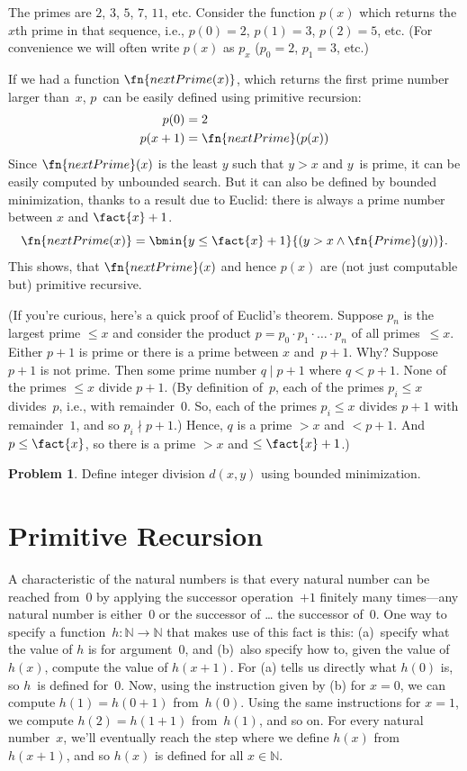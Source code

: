 \documentclass[10pt,a4paper]{article}
\theoremstyle{plain}
\theoremstyle{definition}
\newtheorem{prob}{Problem}[section]
\theoremstyle{remark}
\newcommand*{\olfileid}[3]{}
\newcommand*{\olsection}[1]{\section*{#1}}
\providecommand{\Nat}{\ensuremath{\mathbb{N}}}
\begin{document}
The primes are $2$, $3$, $5$, $7$, $11$, etc. Consider the function
$p(x)$ which returns the $x$th prime in that sequence, i.e., $p(0) =
2$, $p(1) = 3$, $p(2) = 5$, etc. (For convenience we will often write
$p(x)$ as $p_x$ ($p_0=2$, $p_1=3$, etc.)

If we had a function
$\fn{nextPrime(x)}$, which returns the first prime number larger
than~$x$, $p$~can be easily defined using primitive recursion:
\begin{align*}
  p(0) & = 2\\
  p(x+1) & = \fn{nextPrime}(p(x))
\end{align*}
Since $\fn{nextPrime}(x)$ is the least $y$ such that $y > x$ and
$y$~is prime, it can be easily computed by unbounded search. But it
can also be defined by bounded minimization, thanks to a result due to
Euclid: there is always a prime number between $x$ and $\fact{x}+1$.
\[
  \fn{nextPrime(x)} =
  \bmin{y \leq \fact{x}+1}{(y > x \land \fn{Prime}(y))}.
\]
This shows, that $\fn{nextPrime}(x)$ and hence $p(x)$ are (not just
computable but) primitive recursive.

(If you're curious, here's a quick proof of Euclid's theorem. Suppose
$p_n$ is the largest prime $\le x$ and consider the product $p =
p_0\cdot p_1 \cdot \dots \cdot p_n$ of all primes~$\le x$. Either
$p+1$ is prime or there is a prime between $x$ and~$p+1$.  Why?
Suppose $p+1$ is not prime. Then some prime number $q \mid p+1$ where
$q < p+1$. None of the primes $\le x$ divide $p+1$. (By definition
of~$p$, each of the primes $p_i \le x$ divides~$p$, i.e., with
remainder~$0$. So, each of the primes $p_i \le x$ divides $p+1$ with
remainder~$1$, and so $p_i \nmid p+1$.)  Hence, $q$ is a prime $>
x$ and $< p+1$.  And $p \le \fact{x}$, so there is a prime $> x$ and $\le
\fact{x}+1$.)

\begin{prob}
Define integer division $d(x, y)$ using bounded minimization.
\end{prob}





\olfileid{cmp}{rec}{pre}
\olsection{Primitive Recursion}

A characteristic of the natural numbers is that every natural number
can be reached from~$0$ by applying the successor operation~$+1$
finitely many times---any natural number is either~$0$ or the
successor of \dots{} the successor of~$0$. One way to specify a
function~$h\colon\Nat \to \Nat$ that makes use of this fact is this:
(a)~specify what the value of $h$ is for argument~$0$, and (b)~also
specify how to, given the value of $h(x)$, compute the value of
$h(x+1)$. For (a) tells us directly what $h(0)$ is, so $h$~is defined
for~$0$. Now, using the instruction given by (b) for $x=0$, we can
compute $h(1) = h(0+1)$ from~$h(0)$. Using the same instructions for
$x=1$, we compute $h(2) = h(1+1)$ from~$h(1)$, and so on. For every
natural number~$x$, we'll eventually reach the step where we define
$h(x)$ from $h(x+1)$, and so $h(x)$ is defined for all $x \in \Nat$.
\end{document}
